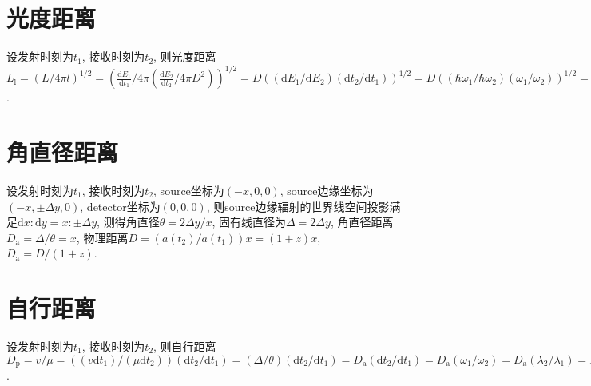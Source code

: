 \documentclass[a4paper,12pt]{\documentclassname}
\title{}
\author{}
\date{}
\def\d{\mathrm{d}}
\theoremstyle{definition}
\begin{document}
    \section{光度距离}
    设发射时刻为$t_1$, 接收时刻为$t_2$, 则光度距离$L_\text{l}=(L/4\pi l)^{1/2}=(\frac{\d E_1}{\d t_1}/4\pi (\frac{\d E_2}{\d t_2}/4\pi D^2))^{1/2}=D((\d E_1/\d E_2)(\d t_2/\d t_1))^{1/2}=D((\hbar\omega_1/\hbar\omega_2)(\omega_1/\omega_2))^{1/2}=D(\omega_1/\omega_2)=D(\lambda_2/\lambda_1)=D(1+z)$.
    \section{角直径距离}
    设发射时刻为$t_1$, 接收时刻为$t_2$, source坐标为$(-x,0,0)$, source边缘坐标为$(-x,\pm\Delta y,0)$, detector坐标为$(0,0,0)$, 则source边缘辐射的世界线空间投影满足$\d x: \d y=x: \pm\Delta y$, 测得角直径$\theta=2\Delta y/x$, 固有线直径为$\Delta=2\Delta y$, 角直径距离$D_\text{a}=\Delta/\theta=x$, 物理距离$D=(a(t_2)/a(t_1))x=(1+z)x$, $D_\text{a}=D/(1+z)$.
    \section{自行距离}
    设发射时刻为$t_1$, 接收时刻为$t_2$, 则自行距离$D_\text{p}=v/\mu=((v\d t_1)/(\mu\d t_2))(\d t_2/\d t_1)=(\Delta/\theta)(\d t_2/\d t_1)=D_\text{a}(\d t_2/\d t_1)=D_\text{a}(\omega_1/\omega_2)=D_\text{a}(\lambda_2/\lambda_1)=D_\text{a}(1+z)=D$.
\end{document}
